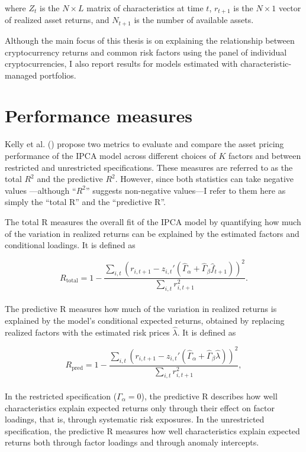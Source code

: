 \documentclass[
  12pt,
  a4paper,
  openany]{scrbook}
\begin{document}
where \(Z_t\) is the \(N \times L\) matrix of characteristics at time
\(t\), \(r_{t+1}\) is the \(N \times 1\) vector of realized asset
returns, and \(N_{t+1}\) is the number of available assets.

Although the main focus of this thesis is on explaining the relationship
between cryptocurrency returns and common risk factors using the panel
of individual cryptocurrencies, I also report results for models
estimated with characteristic-managed portfolios.

\section{Performance measures}\label{performance-measures}

Kelly et al. () propose
two metrics to evaluate and compare the asset pricing performance of the
IPCA model across different choices of \(K\) factors and between
restricted and unrestricted specifications. These measures are referred
to as the total \(R^2\) and the predictive \(R^2\). However, since both
statistics can take negative values ---although ``\(R^2\)'' suggests
non-negative values---I refer to them here as simply the ``total R'' and
the ``predictive R''.

The total R measures the overall fit of the IPCA model by quantifying
how much of the variation in realized returns can be explained by the
estimated factors and conditional loadings. It is defined as

\[
R_\text{total} = 1 - 
\frac{\sum_{i,t} \left(r_{i,t+1} - z_{i,t}'(\hat{\Gamma}_\alpha + \hat{\Gamma}_\beta \hat{f}_{t+1})\right)^2}
{\sum_{i,t} r_{i,t+1}^2}.
\]\\
The predictive R measures how much of the variation in realized returns
is explained by the model's conditional expected returns, obtained by
replacing realized factors with the estimated risk prices
\(\hat \lambda\). It is defined as

\[
R_\text{pred} = 1 - 
\frac{\sum_{i,t} \left(r_{i,t+1} - z_{i,t}'(\hat{\Gamma}_\alpha + \hat{\Gamma}_\beta \hat{\lambda})\right)^2}
{\sum_{i,t} r_{i,t+1}^2},
\]\\
In the restricted specification (\(\Gamma_\alpha = 0\)), the predictive
R describes how well characteristics explain expected returns only
through their effect on factor loadings, that is, through systematic
risk exposures. In the unrestricted specification, the predictive R
measures how well characteristics explain expected returns both through
factor loadings and through anomaly intercepts.
\end{document}
